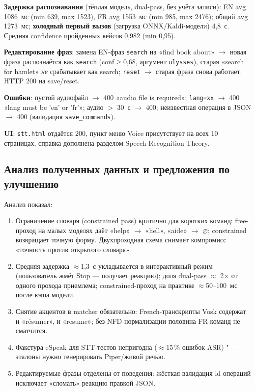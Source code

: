 \textbf{Задержка распознавания} (тёплая модель, dual-pass, без учёта
записи): EN avg 1086~мс (min 639, max 1523), FR avg 1553~мс
(min 985, max 2476); общий avg 1273~мс; \textbf{холодный первый вызов}
(загрузка ONNX/Kaldi-модели) 4,8~с. Средняя confidence пройденных
кейсов 0,982 (min 0,95).

\textbf{Редактирование фраз}: замена EN-фраз \texttt{search} на
«find book about» $\to$ новая фраза распознаётся как \texttt{search}
(conf$\ge$0,68, аргумент \texttt{ulysses}), старая «search for hamlet»
\emph{не} срабатывает как search; \texttt{reset} $\to$ старая фраза
снова работает. HTTP 200 на save/reset.

\textbf{Ошибки}: пустой аудиофайл $\to$ 400 «audio file is required»;
\texttt{lang=xx} $\to$ 400 «lang must be 'en' or 'fr'»;
аудио $>$ 30~с $\to$ 400; неизвестная операция в JSON $\to$ 400
(валидация \texttt{save\_commands}).

\textbf{UI}: \texttt{stt.html} отдаётся 200, пункт меню Voice присутствует
на всех 10 страницах, справка дополнена разделом Speech Recognition Theory.

\subsection{Анализ полученных данных и предложения по улучшению}

Анализ показал:

\begin{enumerate}
	\item Ограничение словаря (constrained pass) критично для коротких
	      команд: free-проход на малых моделях даёт «help» $\to$ «hell»,
	      «aide» $\to$ $\varnothing$; constrained возвращает точную форму.
	      Двухпроходная схема снимает компромисс «точность против
	      открытого словаря».
	\item Средняя задержка $\approx$1,3~с укладывается в интерактивный
	      режим (пользователь жмёт Stop --- получает реакцию); доля
	      dual-pass $\approx$ 2$\times$ от одного прохода приемлема;
	      constrained-проход на практике $\approx$50--100~мс после
	      кэша модели.
	\item Снятие акцентов в matcher обязательно: French-транскрипты
	      Vosk содержат и «résumer», и «resume»; без NFD-нормализации
	      половина FR-команд не сматчится.
	\item Факстура eSpeak для STT-тестов непригодна ($\approx$15\,\%
	      ошибок ASR) "--- эталоны нужно генерировать Piper/живой речью.
	\item Редактируемые фразы отделены от поведения: жёсткая валидация
	      id операций исключает «сломать» реакцию правкой JSON.
\end{enumerate}

